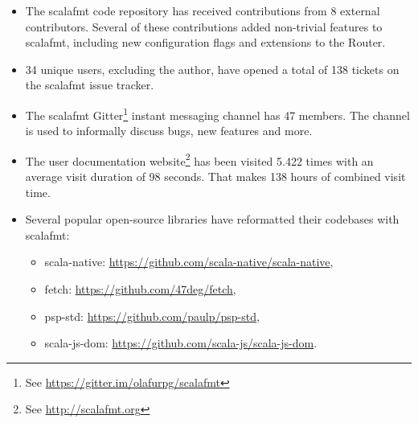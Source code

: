 \begin{itemize}
  \item The scalafmt code repository has received contributions from 8 external contributors.
    Several of these contributions added non-trivial features to scalafmt, including
    new configuration flags and extensions to the Router.
  \item 34 unique users, excluding the author, have opened a total of 138 tickets on the scalafmt issue tracker.
  \item The scalafmt Gitter\footnote{See \url{https://gitter.im/olafurpg/scalafmt}} instant messaging channel has 47 members. The channel is used to informally discuss bugs, new features and more.
  \item The user documentation website\footnote{See \url{http://scalafmt.org}} has been visited 5.422 times with an average visit duration of 98 seconds. That makes 138 hours of combined visit time.
  \item Several popular open-source libraries have reformatted their codebases with scalafmt:
    \begin{itemize}
      \item scala-native: \url{https://github.com/scala-native/scala-native},
      \item fetch: \url{https://github.com/47deg/fetch},
      \item psp-std: \url{https://github.com/paulp/psp-std},
      \item scala-js-dom: \url{https://github.com/scala-js/scala-js-dom}.
    \end{itemize}
\end{itemize}




